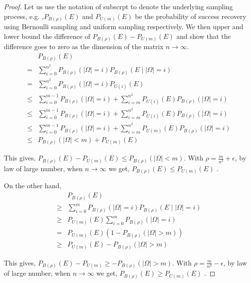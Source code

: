 \begin{proof}
Let us use the notation of subscrpt to denote the underlying sampling process, e.g. ,$P_{B(\rho)}(E)$ and $P_{U(m)}(E)$ be the probability of success recovery using Bernoulli sampling and uniform sampling respectively. We then upper and lower bound the difference of $P_{B(\rho)}(E)-P_{U(m)}(E)$ and show that the difference goes to zero as the dimension of the matrix $n\to\infty$. \\

\begin{eqnarray*}
 &  & P_{B(\rho)}(E)\\
 & = & \sum_{i=0}^{n^{2}}P_{B(\rho)}(|\Omega|=i)P_{B(\rho)}(E\mid|\Omega|=i)\\
 & = & \sum_{i=0}^{n^{2}}P_{B(\rho)}(|\Omega|=i)P_{U(i)}(E)\\
 & \le & \sum_{i=0}^{m-1}P_{B(\rho)}(|\Omega|=i)+\sum_{i=m}^{n^{2}}P_{U(i)}(E)P_{B(\rho)}(|\Omega|=i)\\
 & \le & \sum_{i=0}^{m-1}P_{B(\rho)}(|\Omega|=i)+\sum_{i=m}^{n^{2}}P_{U(i)}(E)P_{B(\rho)}(|\Omega|=i)\\
 & \le & \sum_{i=0}^{m-1}P_{B(\rho)}(|\Omega|=i)+\sum_{i=m}^{n^{2}}P_{U(m)}(E)P_{B(\rho)}(|\Omega|=i)\\
 & \le & P_{B(\rho)}(|\Omega|<m)+P_{U(m)}(E)
\end{eqnarray*}


This gives, $P_{B(\rho)}(E)-P_{U(m)}(E)\le P_{B(\rho)}(|\Omega|<m)$. With $\rho=\frac{m}{n^{2}}+\epsilon$, by law of large number, when $n\to\infty$ we get, $P_{B(\rho)}(E)\le P_{U(m)}(E)$ .

On the other hand, 
\begin{eqnarray*}
 &  & P_{B(\rho)}(E)\\
 & \ge & \sum_{i=0}^{m}P_{B(\rho)}(|\Omega|=i)P_{B(\rho)}(E\mid|\Omega|=i)\\
 & \ge & P_{U(m)}(E)\sum_{i=0}^{m}P_{B(\rho)}(|\Omega|=i)\\
 & = & P_{U(m)}(E)(1-P_{B(\rho)}(|\Omega|>m))\\
 & \ge & P_{U(m)}(E)-P_{B(\rho)}(|\Omega|>m)
\end{eqnarray*}


This gives, $P_{B(\rho)}(E)-P_{U(m)}\ge-P_{B(\rho)}(|\Omega|>m)$. With $\rho=\frac{m}{n^{2}}-\epsilon$, by law of large number, when $n\to\infty$ we get, $P_{B(\rho)}(E)\ge P_{U(m)}(E)$ .
\end{proof}

